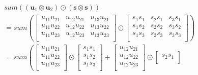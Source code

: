 \begin{align*}
   & sum\left((\textbf{u}_1 \otimes \textbf{u}_2) \odot (\textbf{s} \otimes \textbf{s} )\right)                                                             \\
   & = sum\left(\begin{bmatrix}
                    u_{11}u_{21} & u_{12}u_{21} & u_{13}u_{21} \\
                    u_{11}u_{22} & u_{12}u_{22} & u_{13}u_{22} \\
                    u_{11}u_{23} & u_{12}u_{23} & u_{13}u_{23} \\
                  \end{bmatrix} \odot \begin{bmatrix}
                                        s_{1}s_{1} & s_{2}s_{1} & s_{3}s_{1} \\
                                        s_{1}s_{2} & s_{2}s_{2} & s_{3}s_{2} \\
                                        s_{1}s_{3} & s_{2}s_{3} & s_{3}s_{3} \\
                                      \end{bmatrix}\right)                                                                                 \\
   & = sum\left(\begin{bmatrix}
                    u_{11}u_{21} \\
                    u_{11}u_{22} \\
                    u_{11}u_{23} \\
                  \end{bmatrix} \odot \begin{bmatrix}
                                        s_{1}s_{1} \\
                                        s_{1}s_{2} \\
                                        s_{1}s_{3} \\
                                      \end{bmatrix}
  + \begin{bmatrix}
        u_{12}u_{21} \\
        u_{12}u_{22} \\
        u_{12}u_{23} \\
      \end{bmatrix} \odot \begin{bmatrix}
                            s_{2}s_{1} \\

\end{bmatrix}
\end{align*}

